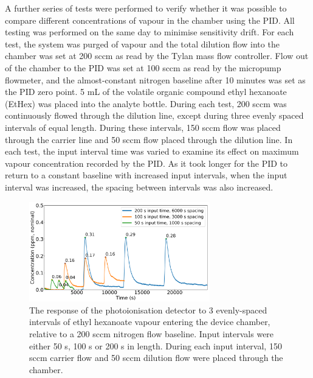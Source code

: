 \documentclass[
  a4paper,
]{scrbook}
\begin{document}
A further series of tests were performed to verify whether it was
possible to compare different concentrations of vapour in the chamber
using the PID. All testing was performed on the same day to minimise
sensitivity drift. For each test, the system was purged of vapour and
the total dilution flow into the chamber was set at 200 sccm as read by
the Tylan mass flow controller. Flow out of the chamber to the PID was
set at 100 sccm as read by the micropump flowmeter, and the
almost-constant nitrogen baseline after 10 minutes was set as the PID
zero point. 5 mL of the volatile organic compound ethyl hexanoate
(EtHex) was placed into the analyte bottle. During each test, 200 sccm
was continuously flowed through the dilution line, except during three
evenly spaced intervals of equal length. During these intervals, 150
sccm flow was placed through the carrier line and 50 sccm flow placed
through the dilution line. In each test, the input interval time was
varied to examine its effect on maximum vapour concentration recorded by
the PID. As it took longer for the PID to return to a constant baseline
with increased input intervals, when the input interval was increased,
the spacing between intervals was also increased.

\begin{figure}

{\centering \includegraphics[width=0.7\textwidth,height=\textheight]{figures/ch5/input_time_comparison.png}

}

\caption{\label{fig-concentration-comparison}The response of the
photoionisation detector to 3 evenly-spaced intervals of ethyl hexanoate
vapour entering the device chamber, relative to a 200 sccm nitrogen flow
baseline. Input intervals were either 50 s, 100 s or 200 s in length.
During each input interval, 150 sccm carrier flow and 50 sccm dilution
flow were placed through the chamber.}

\end{figure}
\end{document}
